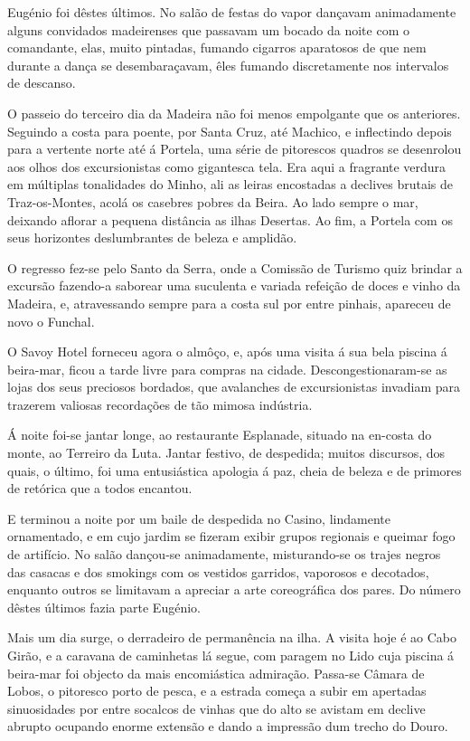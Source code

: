 \documentclass[9pt]{article}
\begin{document}
Eugé\-nio foi dêstes últimos. No salão de festas do vapor dan\-çavam animadamente alguns convidados madeirenses que passavam um bocado da noite
com o comandante, elas, muito pintadas, fumando cigarros aparatosos de que
nem durante a dan\-ça se desembaraçavam, êles fumando discretamente nos intervalos de descanso.

O passeio do terceiro dia da Madeira não foi menos empolgante que os
anteriores. Seguindo a costa para poente, por Santa Cruz, até Machico, e inflectindo depois para a vertente norte até á Portela, uma série de pitorescos quadros se desenrolou aos o\-lhos dos excursionistas como gigantesca
tela. Era aqui a fragrante verdura em múltiplas tonalidades do Minho,
ali as leiras encostadas a declives brutais de Traz-os-Montes, acolá os
casebres pobres da Beira. Ao lado sempre o mar, deixando aflorar a pequena
distância as i\-lhas Desertas. Ao fim, a Portela com os seus horizontes deslumbrantes de beleza e amplidão.

O regresso fez-se pelo Santo da Serra, onde a Comissão de Turismo
quiz brindar a excursão fazendo-a saborear uma suculenta e variada refei\-ção de doces e vinho da Madeira, e, atravessando sempre para a costa sul
por entre pinhais, apareceu de novo o Funchal.

O Savoy Hotel forneceu agora o almôço, e, após uma visita á sua bela
piscina á beira-mar, ficou a tarde livre para compras na cidade. Descongestionaram-se as lojas dos seus preciosos bordados, que avalanches de excursionistas invadiam para trazerem valiosas recorda\-ções de tão mimosa
indústria.

Á noite foi-se jantar longe, ao restaurante Esplanade, situado na en-costa do monte, ao Terreiro da Luta. Jantar festivo, de despedida; muitos
discursos, dos quais, o último, foi uma entusiástica apologia á paz, cheia de
beleza e de primores de retórica que a todos encantou.

E terminou a noite por um baile de despedida no Casino, lindamente
ornamentado, e em cujo jardim se fizeram exibir grupos regionais e queimar
fogo de artifício. No salão dançou-se animadamente, misturando-se os trajes negros das casacas e dos smokings com os vestidos garridos, vaporosos
e decotados, enquanto outros se limitavam a apreciar a arte coreográfi\-ca
dos pares. Do número dêstes últimos fazia parte Eugé\-nio.

Mais um dia surge, o derradeiro de permanência na i\-lha. A visita hoje
é ao Cabo Girão, e a caravana de caminhetas lá segue, com paragem no Lido
cuja piscina á beira-mar foi objecto da mais encomiástica admira\-ção. Passa-se Câmara de Lobos, o pitoresco porto de pesca, e a estrada começa a subir em apertadas sinuosidades por entre socalcos de vinhas que do alto
se avistam em declive abrupto ocupando enorme extensão e dando a impressão dum trecho do Douro.
\end{document}
